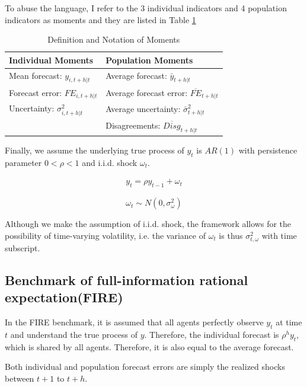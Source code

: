\documentclass[12pt]{article}
\begin{document}
	To abuse the language, I refer to the 3 individual indicators and 4 population indicators as moments and they are  listed in Table \ref{MomSum} 
	
	\begin{table}[ht]
		\centering
		\caption{Definition and Notation of Moments}
		\label{MomSum}
		\begin{tabular}{ll}
			
			\hline 
			Individual Moments                                  & Population Moments                             \\
			\hline 
			Mean forecast: $y_{i,t+h|t}$                   & Average forecast: $\bar y_{t+h|t}$                   \\
			Forecast error: $FE_{i,t+h|t}$ & Average forecast error: $\overline{FE}_{t+h|t}$ \\
			Uncertainty: $\sigma^2_{i,t+h|t}$         & Average uncertainty:  $\bar \sigma^2_{t+h|t}$ \\
			& Disagreements:  $\overline{Disg}_{t+h|t}$       \\
			\hline 
		\end{tabular}
	\end{table}
	
	Finally, we assume the underlying true process of $y_{t}$ is $AR(1)$ with persistence parameter $0<\rho <1$ and i.i.d. shock $\omega_t$. 
	
	\begin{eqnarray}\label{AR_process}
		y_{t} = \rho y_{t-1} + \omega_t
	\end{eqnarray}
	
	$$\omega_t \sim N(0,\sigma^2_{\omega})$$
	
	Although we make the assumption of i.i.d. shock, the framework allows for the possibility of time-varying volatility, i.e. the variance of $\omega_t$ is thus $\sigma^2_{t,\omega}$ with time subscript. 
	
	\subsection{Benchmark of full-information rational expectation(FIRE)}
	
	In the FIRE benchmark,  it is assumed that all agents perfectly observe $y_t$ at time $t$ and understand the true process of $y$. Therefore, the individual forecast is $\rho^h y_t $, which is shared by all agents. Therefore, it is also equal to the average forecast. 
	
	Both individual and population forecast errors are simply the realized shocks between $t+1$ to $t+h$.  
	
\end{document}
